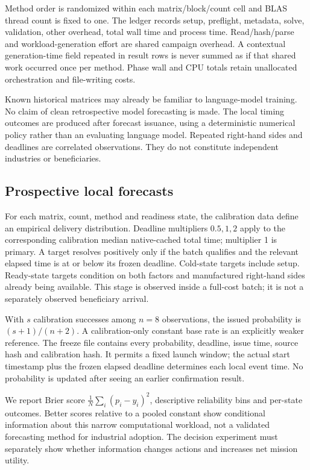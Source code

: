 \documentclass[11pt,a4paper]{article}
\begin{document}
Method order is randomized within each matrix/block/count cell and BLAS thread count is fixed to one. The ledger records setup, preflight, metadata, solve, validation, other overhead, total wall time and process time. Read/hash/parse and workload-generation effort are shared campaign overhead. A contextual generation-time field repeated in result rows is never summed as if that shared work occurred once per method. Phase wall and CPU totals retain unallocated orchestration and file-writing costs.

Known historical matrices may already be familiar to language-model training. No claim of clean retrospective model forecasting is made. The local timing outcomes are produced after forecast issuance, using a deterministic numerical policy rather than an evaluating language model. Repeated right-hand sides and deadlines are correlated observations. They do not constitute independent industries or beneficiaries.

\subsection{Prospective local forecasts}
For each matrix, count, method and readiness state, the calibration data define an empirical delivery distribution. Deadline multipliers $0.5,1,2$ apply to the corresponding calibration median native-cached total time; multiplier 1 is primary. A target resolves positively only if the batch qualifies and the relevant elapsed time is at or below its frozen deadline. Cold-state targets include setup. Ready-state targets condition on both factors and manufactured right-hand sides already being available. This stage is observed inside a full-cost batch; it is not a separately observed beneficiary arrival.

With $s$ calibration successes among $n=8$ observations, the issued probability is $(s+1)/(n+2)$. A calibration-only constant base rate is an explicitly weaker reference. The freeze file contains every probability, deadline, issue time, source hash and calibration hash. It permits a fixed launch window; the actual start timestamp plus the frozen elapsed deadline determines each local event time. No probability is updated after seeing an earlier confirmation result.

We report Brier score $\frac1N\sum_i(p_i-y_i)^2$, descriptive reliability bins and per-state outcomes. Better scores relative to a pooled constant show conditional information about this narrow computational workload, not a validated forecasting method for industrial adoption. The decision experiment must separately show whether information changes actions and increases net mission utility.
\end{document}
